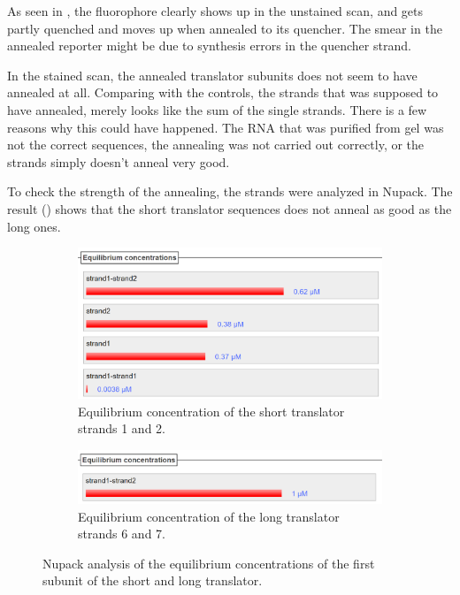 As seen in , the fluorophore clearly shows up in the unstained scan, and gets partly quenched and moves up when annealed to its quencher. The smear in the annealed reporter might be due to synthesis errors in the quencher strand.

In the stained scan, the annealed translator subunits does not seem to have annealed at all. Comparing with the controls, the strands that was supposed to have annealed, merely looks like the sum of the single strands. There is a few reasons why this could have happened. The RNA that was purified from gel was not the correct sequences, the annealing was not carried out correctly, or the strands simply doesn't anneal very good.

To check the strength of the annealing, the strands were analyzed in Nupack. The result () shows that the short translator sequences does not anneal as good as the long ones.

\begin{figure}
\begin{subfigure}[b]{.49\columnwidth}
  \centering
  \includegraphics[width=\linewidth]{images/short_annealing_concentration.png}
  \caption{Equilibrium concentration of the short translator strands 1 and 2.}
\end{subfigure}
\hfill
\begin{subfigure}[b]{.49\columnwidth}
  \centering
  \includegraphics[width=\linewidth]{images/long_annealing_concentration.png}
  \caption{Equilibrium concentration of the long translator strands 6 and 7.}
\end{subfigure}
\caption{Nupack analysis of the equilibrium concentrations of the first subunit of the short and long translator.}
\label{annealing_concentration}
\end{figure}

